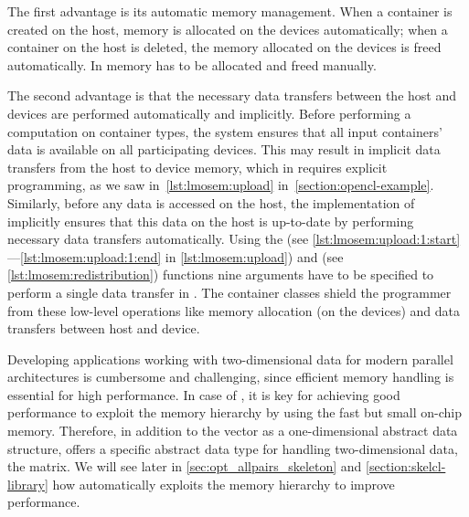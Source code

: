 The first advantage is its automatic memory management.
When a container is created on the host, memory is allocated on the devices automatically;
when a container on the host is deleted, the memory allocated on the devices is freed automatically.
In \OpenCL memory has to be allocated and freed manually.

The second advantage is that the necessary data transfers between the host and devices are performed automatically and implicitly.
Before performing a computation on container types, the \SkelCL system ensures that all input containers' data is available on all participating devices.
This may result in implicit data transfers from the host to device memory, which in \OpenCL requires explicit programming, as we saw in~\autoref{lst:lmosem:upload} in~\autoref{section:opencl-example}.
Similarly, before any data is accessed on the host, the implementation of \SkelCL implicitly ensures that this data on the host is up-to-date by performing necessary data transfers automatically.
Using the  (see \autoref{lst:lmosem:upload:1:start}---\autoref{lst:lmosem:upload:1:end} in \autoref{lst:lmosem:upload}) and  (see \autoref{lst:lmosem:redistribution}) functions nine arguments have to be specified to perform a single data transfer in \OpenCL.
The \SkelCL container classes shield the programmer from these low-level operations like memory allocation (on the devices) and data transfers between host and device.

Developing applications working with two-dimensional data for modern parallel architectures is cumbersome and challenging, since efficient memory handling is essential for high performance.
In case of \GPUs, it is key for achieving good performance to exploit the memory hierarchy by using the fast but small on-chip memory.
Therefore, in addition to the vector as a one-dimensional abstract data structure, \SkelCL offers a specific abstract data type for handling two-dimensional data, the matrix.
We will see later in \autoref{sec:opt_allpairs_skeleton} and \autoref{section:skelcl-library} how \SkelCL automatically exploits the memory hierarchy to improve performance.



